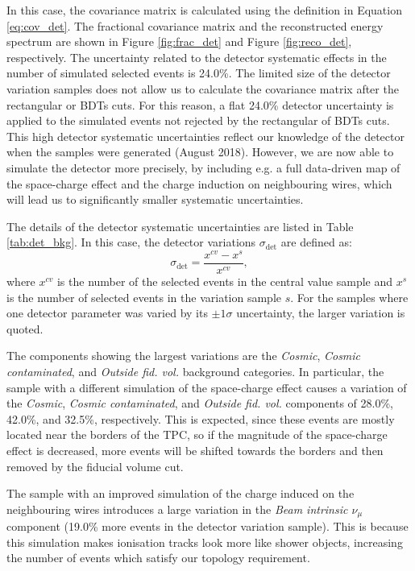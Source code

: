 In this case, the covariance matrix is calculated using the definition in Equation \ref{eq:cov_det}. The fractional covariance matrix and the reconstructed energy spectrum are shown in Figure \ref{fig:frac_det} and Figure \ref{fig:reco_det}, respectively.
The uncertainty related to the detector systematic effects in the number of simulated selected events is 24.0\%. The limited size of the detector variation samples does not allow us to calculate the covariance matrix after the rectangular or BDTs cuts. For this reason, a flat 24.0\% detector uncertainty is applied to the simulated events not rejected by the rectangular of BDTs cuts. This high detector systematic uncertainties reflect our knowledge of the detector when the samples were generated (August 2018). However, we are now able to simulate the detector more precisely, by including e.g. a full data-driven map of the space-charge effect and the charge induction on neighbouring wires, which will lead us to significantly smaller systematic uncertainties. %

The details of the detector systematic uncertainties are listed in Table \ref{tab:det_bkg}. In this case, the detector variations $\sigma_{\mathrm{det}}$ are defined as:
\begin{equation}
    \sigma_{\mathrm{det}} = \frac{x^{cv} - x^s}{x^{cv}},
\end{equation}
where $x^{cv}$ is the number of the selected events in the central value sample and $x^s$ is the number of selected events in the variation sample $s$. For the samples where one detector parameter was varied by its $\pm1\sigma$ uncertainty, the larger variation is quoted.

The components showing the largest variations are the \emph{Cosmic}, \emph{Cosmic contaminated}, and \emph{Outside fid. vol.} background categories. In particular, the sample with a different simulation of the space-charge effect causes a variation of the \emph{Cosmic}, \emph{Cosmic contaminated}, and \emph{Outside fid. vol.} components of 28.0\%, 42.0\%, and 32.5\%, respectively. This is expected, since these events are mostly located near the borders of the TPC, so if the magnitude of the space-charge effect is decreased, more events will be shifted towards the borders and then removed by the fiducial volume cut.

The sample with an improved simulation of the charge induced on the neighbouring wires introduces a large variation in the \emph{Beam intrinsic $\nu_{\mu}$} component (19.0\% more events in the detector variation sample). This is because this simulation makes ionisation tracks look more like shower objects, increasing the number of events which satisfy our topology requirement.

